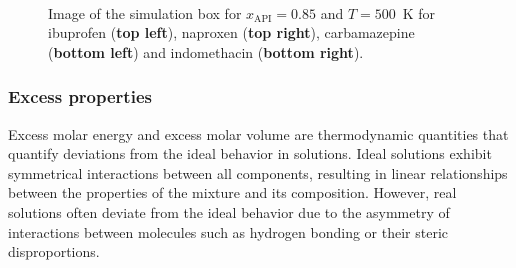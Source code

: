 \begin{figure}[htb!]
	\centering
	\hspace{0.2cm}
	\\
	\vspace{0.2cm}
	\hspace{0.2cm}
	\caption{Image of the simulation box for $x_{\text{API}}=0.85$ and $T=500$~K for ibuprofen (\textbf{top left}), naproxen (\textbf{top right}), carbamazepine (\textbf{bottom left}) and indomethacin (\textbf{bottom right}).}
	\label{fig:mix_boxes}
\end{figure}
\vspace{-0.6cm}
\subsubsection{Excess properties}
\vspace{-0.2cm}
Excess molar energy and excess molar volume are thermodynamic quantities that quantify deviations from the ideal behavior in solutions. Ideal solutions exhibit symmetrical interactions between all components, resulting in linear relationships between the properties of the mixture and its composition. However, real solutions often deviate from the ideal behavior due to the asymmetry of interactions between molecules such as hydrogen bonding or their steric disproportions.

